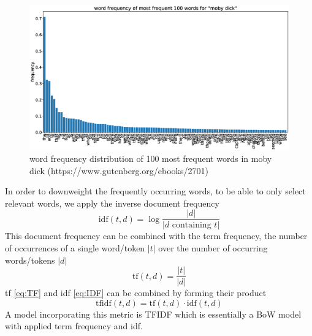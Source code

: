 \begin{figure}[h]
  \centering
  \includegraphics[width=.95\textwidth]{images/moby-tfidf.eps}
  \caption{word frequency distribution of 100 most frequent words in moby dick (https://www.gutenberg.org/ebooks/2701)}
  \label{fig:moby-tfidf}
\end{figure}

In order to downweight the frequently occurring words, to be able to only select relevant words, we apply the inverse
document frequency
\begin{equation}
  \text{idf}(t, d) = \log \frac{|d|}{|d \text{ containing } t|}
  \label{eq:IDF}
\end{equation}
This document frequency can be combined with the term frequency, the number of occurrences of a single word/token $|t|$ over the number of occurring words/tokens $|d|$
\begin{equation}
  \text{tf}(t, d) = \frac{|t|}{|d|}
  \label{eq:TF}
\end{equation}
tf \eqref{eq:TF} and idf \eqref{eq:IDF} can be combined by forming their product
\begin{equation}
  \text{tfidf}(t, d) = \text{tf}(t, d) \cdot \text{idf}(t, d)
  \label{eq:TF-IDF}
\end{equation}
A model incorporating this metric is TFIDF which is essentially a BoW model with applied term frequency and idf.

